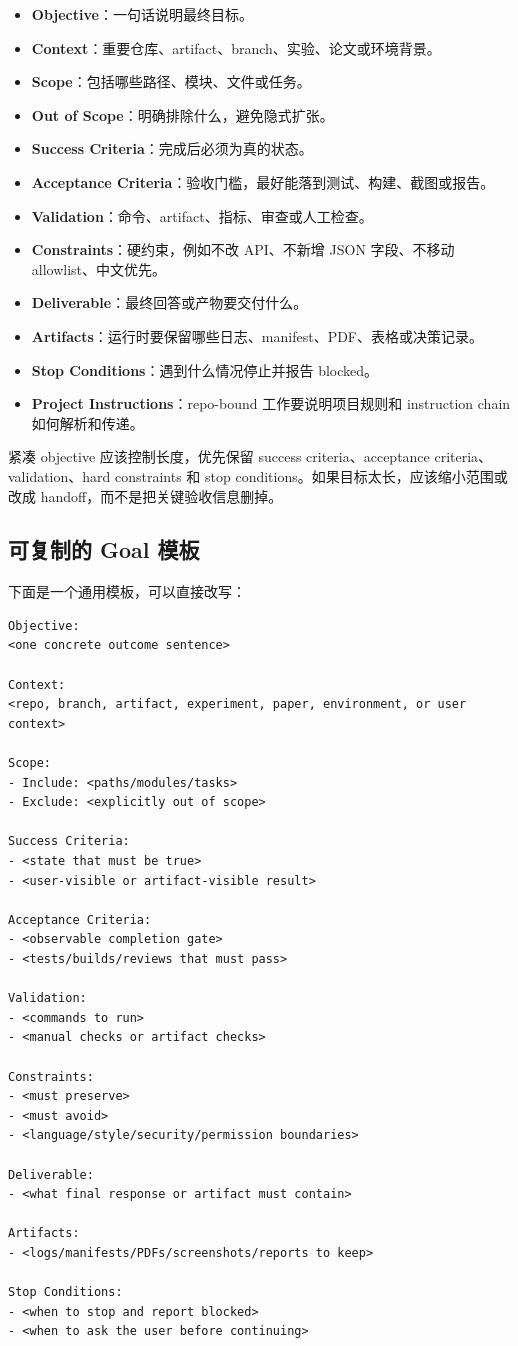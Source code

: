 \documentclass[UTF8,a4paper,11pt,fontset=none]{ctexart}
\newcommand{\keypoint}[1]{\textbf{#1}}
\begin{document}
\begin{itemize}
  \item \keypoint{Objective}：一句话说明最终目标。
  \item \keypoint{Context}：重要仓库、artifact、branch、实验、论文或环境背景。
  \item \keypoint{Scope}：包括哪些路径、模块、文件或任务。
  \item \keypoint{Out of Scope}：明确排除什么，避免隐式扩张。
  \item \keypoint{Success Criteria}：完成后必须为真的状态。
  \item \keypoint{Acceptance Criteria}：验收门槛，最好能落到测试、构建、截图或报告。
  \item \keypoint{Validation}：命令、artifact、指标、审查或人工检查。
  \item \keypoint{Constraints}：硬约束，例如不改 API、不新增 JSON 字段、不移动 allowlist、中文优先。
  \item \keypoint{Deliverable}：最终回答或产物要交付什么。
  \item \keypoint{Artifacts}：运行时要保留哪些日志、manifest、PDF、表格或决策记录。
  \item \keypoint{Stop Conditions}：遇到什么情况停止并报告 blocked。
  \item \keypoint{Project Instructions}：repo-bound 工作要说明项目规则和 instruction chain 如何解析和传递。
\end{itemize}

紧凑 objective 应该控制长度，优先保留 success criteria、acceptance criteria、validation、hard constraints 和 stop conditions。如果目标太长，应该缩小范围或改成 handoff，而不是把关键验收信息删掉。

\subsection{可复制的 Goal 模板}

下面是一个通用模板，可以直接改写：

\begin{lstlisting}
Objective:
<one concrete outcome sentence>

Context:
<repo, branch, artifact, experiment, paper, environment, or user context>

Scope:
- Include: <paths/modules/tasks>
- Exclude: <explicitly out of scope>

Success Criteria:
- <state that must be true>
- <user-visible or artifact-visible result>

Acceptance Criteria:
- <observable completion gate>
- <tests/builds/reviews that must pass>

Validation:
- <commands to run>
- <manual checks or artifact checks>

Constraints:
- <must preserve>
- <must avoid>
- <language/style/security/permission boundaries>

Deliverable:
- <what final response or artifact must contain>

Artifacts:
- <logs/manifests/PDFs/screenshots/reports to keep>

Stop Conditions:
- <when to stop and report blocked>
- <when to ask the user before continuing>
\end{lstlisting}
\end{document}
